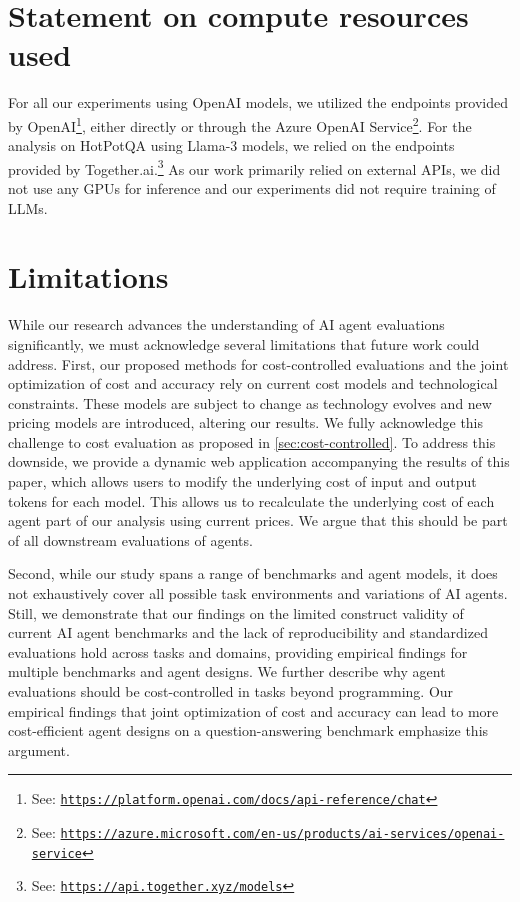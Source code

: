 \documentclass{article}
\begin{document}
\section{Statement on compute resources used}
\label{appendix:compute-resources-statement}

For all our experiments using OpenAI models, we utilized the endpoints provided by OpenAI\footnote{See: \texttt{\url{https://platform.openai.com/docs/api-reference/chat}}}, either directly or through the Azure OpenAI Service\footnote{See: \texttt{\url{https://azure.microsoft.com/en-us/products/ai-services/openai-service}}}. For the analysis on HotPotQA using Llama-3 models, we relied on the endpoints provided by Together.ai.\footnote{See: \texttt{\url{https://api.together.xyz/models}}} As our work primarily relied on external APIs, we did not use any GPUs for inference and our experiments did not require training of LLMs.

\section{Limitations}
\label{appendix:limitations}

While our research advances the understanding of AI agent evaluations significantly, we must acknowledge several limitations that future work could address. First, our proposed methods for cost-controlled evaluations and the joint optimization of cost and accuracy rely on current cost models and technological constraints. These models are subject to change as technology evolves and new pricing models are introduced, altering our results. We fully acknowledge this challenge to cost evaluation as proposed in \cref{sec:cost-controlled}. To address this downside, we provide a dynamic web application accompanying the results of this paper, which allows users to modify the underlying cost of input and output tokens for each model. This allows us to recalculate the underlying cost of each agent part of our analysis using current prices. We argue that this should be part of all downstream evaluations of agents.

Second, while our study spans a range of benchmarks and agent models, it does not exhaustively cover all possible task environments and variations of AI agents. Still, we demonstrate that our findings on the limited construct validity of current AI agent benchmarks and the lack of reproducibility and standardized evaluations hold across tasks and domains, providing empirical findings for multiple benchmarks and agent designs. We further describe why agent evaluations should be cost-controlled in tasks beyond programming. Our empirical findings that joint optimization of cost and accuracy can lead to more cost-efficient agent designs on a question-answering benchmark emphasize this argument.
\end{document}
